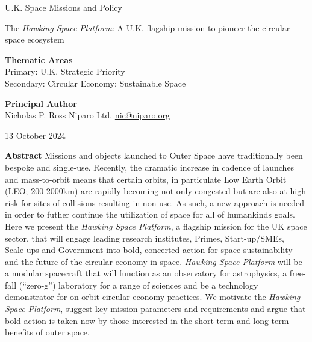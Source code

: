 \documentclass[a4paper,12pt]{article}
\begin{document}
\raggedright
\huge
U.K. Space Missions and Policy \linebreak
\vspace{48pt}


\textcolor{Cerulean}{
The \textit{Hawking Space Platform}: A U.K. flagship mission to pioneer the circular space ecosystem}  
\normalsize
\linebreak \linebreak 
\vspace{48pt}


\noindent \textbf{Thematic Areas} \\
Primary: U.K. Strategic Priority \\
Secondary: Circular Economy; Sustainable Space 
\linebreak
\vspace{24pt}
  
\textbf{Principal Author} \\
Nicholas P. Ross	
 \linebreak						
Niparo Ltd. 
 \linebreak
\href{mailto:nic@niparo.org}{nic@niparo.org}
 \linebreak
 

13 October 2024


\vspace{24pt}
\justify
\textbf{Abstract}
Missions and objects launched to Outer Space have traditionally been
bespoke and single-use.  Recently, the dramatic increase in cadence of
launches and mass-to-orbit means that certain orbits, in particulate
Low Earth Orbit (LEO; 200-2000km) are rapidly becoming not only
congested but are also at high risk for sites of collisions resulting in non-use.
As such, a new approach is needed in order to futher continue the
utilization of space for all of humankinds goals.  Here we present the
\textit{Hawking Space Platform}, a flagship mission for the UK space
sector, that will engage leading research institutes, Primes,
Start-up/SMEs, Scale-ups and Government into bold, concerted action
for space sustainability and the future of the circular economy in
space.
\textit{Hawking Space Platform} will be a modular spacecraft that will function as an observatory for astrophysics, a free-fall (``zero-g'') laboratory for a range of sciences and be a technology demonstrator for on-orbit circular economy practices. We motivate the \textit{Hawking Space Platform}, suggest key
mission parameters and requirements and argue that bold action is taken now by those interested in the
short-term and long-term benefits of outer space.
\end{document}
